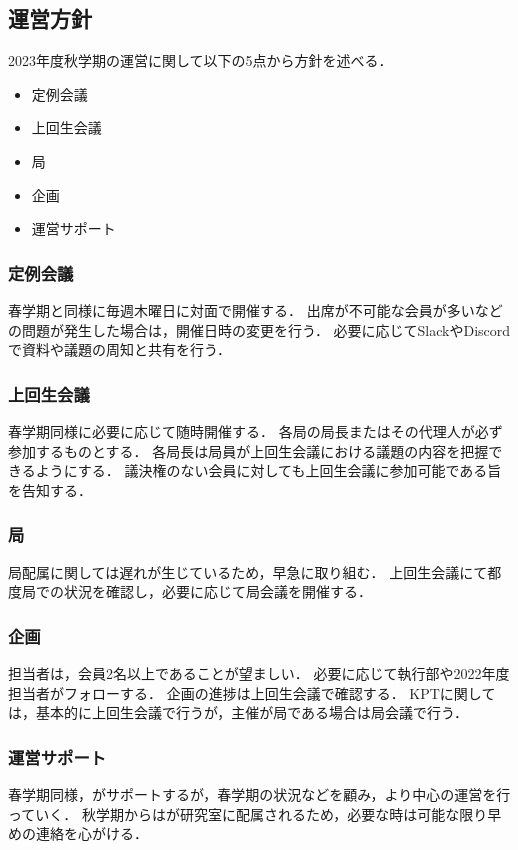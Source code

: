 \subsection*{運営方針}


2023年度秋学期の運営に関して以下の5点から方針を述べる．
\begin{itemize}
    \item 定例会議
    \item 上回生会議
    \item 局
    \item 企画
    \item 運営サポート
\end{itemize}

\subsubsection*{定例会議}
春学期と同様に毎週木曜日に対面で開催する．
出席が不可能な会員が多いなどの問題が発生した場合は，開催日時の変更を行う．
必要に応じてSlackやDiscordで資料や議題の周知と共有を行う．

\subsubsection*{上回生会議}
春学期同様に必要に応じて随時開催する．
各局の局長またはその代理人が必ず参加するものとする．
各局長は局員が上回生会議における議題の内容を把握できるようにする．
議決権のない会員に対しても上回生会議に参加可能である旨を告知する．

\subsubsection*{局}
局配属に関しては遅れが生じているため，早急に取り組む．
上回生会議にて都度局での状況を確認し，必要に応じて局会議を開催する．

\subsubsection*{企画}
担当者は，会員2名以上であることが望ましい．
必要に応じて執行部や2022年度担当者がフォローする．
企画の進捗は上回生会議で確認する．
KPTに関しては，基本的に上回生会議で行うが，主催が局である場合は局会議で行う．

\subsubsection*{運営サポート}
春学期同様，\thirdGrade{}がサポートするが，春学期の状況などを顧み，より\secondGrade{}中心の運営を行っていく．
秋学期からは\thirdGrade{}が研究室に配属されるため，必要な時は可能な限り早めの連絡を心がける．

